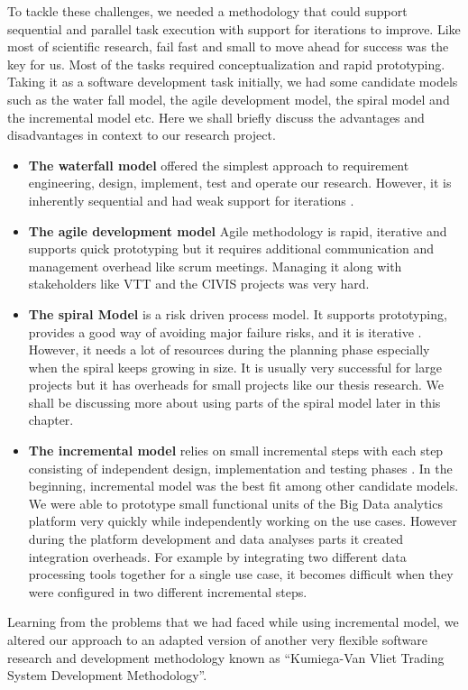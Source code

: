 To tackle these challenges, we needed a methodology that could support sequential and parallel task execution with support for iterations to improve. Like most of scientific research, fail fast and small to move ahead for success was the key for us. Most of the tasks required conceptualization and rapid prototyping. Taking it as a software development task initially, we had some candidate models such as the water fall model, the agile development model, the spiral model and the incremental model etc. Here we shall briefly discuss the advantages and disadvantages in context to our research project. 
\begin{itemize}
\item \textbf{ The waterfall model} offered the simplest approach to requirement engineering, design, implement, test and operate our research. However, it is inherently sequential and had weak support for iterations \cite{Laplante}.
\item \textbf{The agile development model} Agile methodology \cite{martin2003agile} is rapid, iterative and supports quick prototyping but it requires additional communication and management overhead like scrum meetings. Managing it along with stakeholders like VTT and the CIVIS projects was very hard.
\item \textbf{The spiral Model} is a risk driven process model. It supports prototyping, provides a good way of avoiding major failure risks, and it is iterative \cite{Boehm}. However, it needs a lot of resources during the planning phase especially when the spiral keeps growing in size. It is usually very successful for large projects but it has overheads for small projects like our thesis research. We shall be discussing more about using parts of the spiral model later in this chapter.
\item \textbf{The incremental model} relies on small incremental steps with each step consisting of independent design, implementation and testing phases \cite{jacobson1999unified}. In the beginning, incremental model was the best fit among other candidate models. We were able to prototype small functional units of the Big Data analytics platform very quickly while independently working on the use cases. However during the platform development and data analyses parts it created integration overheads. For example by integrating two different data processing tools together for a single use case, it becomes difficult when they were configured in two different incremental steps.  
\end{itemize}
Learning from the problems that we had faced while using incremental model, we altered our approach to an adapted version of another very flexible software research and development methodology known as ``Kumiega-Van Vliet Trading System Development Methodology''\cite{kumiega2008software}.

